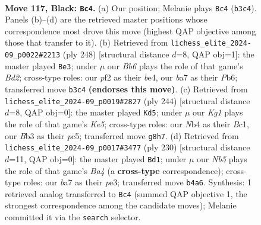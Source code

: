 \documentclass[11pt]{article}
\begin{document}
\clearpage

\begin{figure}[p]\centering
\begin{subfigure}{0.46\textwidth}\centering
\resizebox{\linewidth}{!}{%
\newchessgame
\chessboard[
  setfen={6k1/B7/8/7K/1n6/1b6/5P2/8 b - - 80 117},
  showmover=false,
  pgfstyle=straightmove, color=movearrow, markmove={b3-c4}
]}
\caption{}
\end{subfigure}\hfill
\begin{subfigure}{0.46\textwidth}\centering
\resizebox{\linewidth}{!}{%
\newchessgame
\chessboard[
  setfen={8/8/1P6/8/1K2b3/8/3B4/k7 w - - 77 125},
  showmover=false,
  pgfstyle=straightmove, color=movearrow, markmove={d2-e3}
]}
\caption{}
\end{subfigure}
\\[4pt]
\begin{subfigure}{0.46\textwidth}\centering
\resizebox{\linewidth}{!}{%
\newchessgame
\chessboard[
  setfen={8/8/b5k1/2p1K3/8/3p4/8/2B5 w - - 2 123},
  showmover=false,
  pgfstyle=straightmove, color=movearrow, markmove={e5-d5}
]}
\caption{}
\end{subfigure}\hfill
\begin{subfigure}{0.46\textwidth}\centering
\resizebox{\linewidth}{!}{%
\newchessgame
\chessboard[
  setfen={8/4b3/7p/8/B4k2/4p2K/8/8 w - - 0 116},
  showmover=false,
  pgfstyle=straightmove, color=movearrow, markmove={a4-d1}
]}
\caption{}
\end{subfigure}
\caption{\textbf{Move 117, Black: \texttt{Bc4}.} (a) Our position; Melanie plays \texttt{Bc4} (\texttt{b3c4}). Panels (b)--(d) are the retrieved master positions whose correspondence most drove this move (highest QAP objective among those that transfer to it). (b) Retrieved from \texttt{lichess\_elite\_2024-09\_p0022\#2213} (ply 248) [structural distance $d$=8, QAP obj=1]: the master played \texttt{Be3}; under $\mu$ our \emph{Bb6} plays the role of that game's \emph{Bd2}; cross-type roles: our \emph{p}f2 as their \emph{b}e4, our \emph{b}a7 as their \emph{P}b6; transferred move \texttt{b3c4} \textbf{(endorses this move)}. (c) Retrieved from \texttt{lichess\_elite\_2024-09\_p0019\#2827} (ply 244) [structural distance $d$=8, QAP obj=0]: the master played \texttt{Kd5}; under $\mu$ our \emph{Kg1} plays the role of that game's \emph{Ke5}; cross-type roles: our \emph{N}b4 as their \emph{B}c1, our \emph{B}b3 as their \emph{p}c5; transferred move \texttt{g8h7}. (d) Retrieved from \texttt{lichess\_elite\_2024-09\_p0017\#3477} (ply 230) [structural distance $d$=11, QAP obj=0]: the master played \texttt{Bd1}; under $\mu$ our \emph{Nb5} plays the role of that game's \emph{Ba4} (a \textbf{cross-type} correspondence); cross-type roles: our \emph{b}a7 as their \emph{p}e3; transferred move \texttt{b4a6}. Synthesis: 1 retrieved analog transferred to \texttt{Bc4} (summed QAP objective 1, the strongest correspondence among the candidate moves); Melanie committed it via the \texttt{search} selector.}
\label{fig:thought-m233}
\end{figure}
\end{document}
